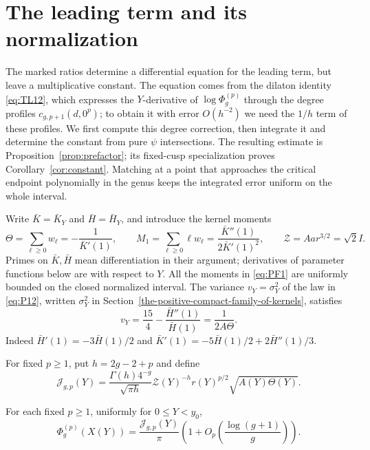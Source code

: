 \section{The leading term and its normalization}\label{sec:prefactor}

The marked ratios determine a differential equation for the leading
term, but leave a multiplicative constant. The equation comes from the
dilaton identity \eqref{eq:TL12}, which expresses the \(Y\)-derivative of
\(\log\Phi_g^{(p)}\) through the degree profiles \(c_{g,p+1}(d,0^p)\); to
obtain it with error \(O(h^{-2})\) we need the \(1/h\) term of these
profiles. We first compute this degree correction, then integrate it and determine the
constant from pure $\psi$ intersections. The resulting estimate is
Proposition~\ref{prop:prefactor}; its fixed-cusp specialization proves
Corollary~\ref{cor:constant}. Matching at a point that approaches the
critical endpoint polynomially in the genus keeps the integrated error
uniform on the whole interval.

Write $\bar K=\bar K_Y$ and $\bar H=\bar H_Y$, and introduce the kernel moments
\begin{equation}
 \Theta=\sum_{\ell\ge0}w_\ell=-\frac1{\bar K'(1)},\qquad
 M_1=\sum_{\ell\ge0}\ell w_\ell=\frac{\bar K''(1)}{2\bar K'(1)^2},\qquad
 \mathcal Z=Aar^{3/2}=\sqrt2 I.
 \label{eq:PF1}
\end{equation}
Primes on $\bar K,\bar H$ mean differentiation in their argument; derivatives of
parameter functions below are with respect to $Y$. All the moments in
\eqref{eq:PF1} are uniformly bounded on the closed normalized interval.
The variance $v_Y=\sigma_Y^2$ of the law in \eqref{eq:P12}, written $\sigma_Y^2$ in Section~\ref{the-positive-compact-family-of-kernels}, satisfies
\begin{equation}
 v_Y=\frac{15}{4}-\frac{\bar H''(1)}{\bar H(1)}=\frac1{2A\Theta}.
 \label{eq:PF2}
\end{equation}
Indeed $\bar H'(1)=-3\bar H(1)/2$ and
$\bar K'(1)=-5\bar H(1)/2+2\bar H''(1)/3$.

For fixed $p\ge1$, put $h=2g-2+p$ and define
\begin{equation}
 \mathcal J_{g,p}(Y)=
 \frac{\Gamma(h)4^{-g}}{\sqrt{\pi h}}
 \mathcal Z(Y)^{-h}r(Y)^{p/2}\sqrt{A(Y)\Theta(Y)}.
 \label{eq:PF3}
\end{equation}
\begin{proposition}\label{prop:prefactor}
For each fixed $p\ge1$, uniformly for $0\le Y<y_0$,
\begin{equation}
 \Phi_g^{(p)}(X(Y))=
 \frac{\mathcal J_{g,p}(Y)}{\pi}
 \left(1+O_p\!\left(\frac{\log(g+1)}g\right)\right).
 \label{eq:PF4}
\end{equation}
\end{proposition}

